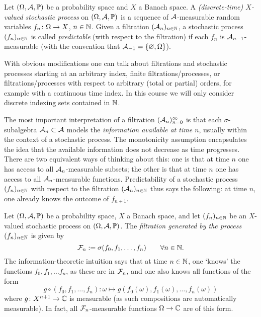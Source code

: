 \begin{defn}
  Let $(\Omega,\mathcal{A},\mathbb{P})$ be a probability space and $X$ a Banach space.
  A \emph{(discrete-time) $X$-valued stochastic process} on $(\Omega,\mathcal{A},\mathbb{P})$ is a sequence of $\mathcal{A}$-measurable random variables $f_n \colon \Omega \rightarrow X$, $n \in \mathbb{N}$.
  Given a filtration $(\mathcal{A}_n)_{n \in \mathbb{N}}$, a stochastic process $(f_n)_{n \in \mathbb{N}}$ is called \emph{predictable} (with respect to the filtration) if each $f_n$ is $\mathcal{A}_{n-1}$-measurable (with the convention that $\mathcal{A}_{-1} = \{\varnothing, \Omega\}$).
\end{defn}

\begin{rmk}
  With obvious modifications one can talk about filtrations and stochastic processes starting at an arbitrary index, finite filtrations/processes, or filtrations/processes with respect to arbitrary (total or partial) orders, for example with a continuous time index.
  In this course we will only consider discrete indexing sets contained in $\mathbb{N}$.
\end{rmk}

The most important interpretation of a filtration $(\mathcal{A}_n)_{n=0}^\infty$ is that each $\sigma$-subalgebra $\mathcal{A}_n \subset \mathcal{A}$ models the \emph{information available at time $n$}, usually within the context of a stochastic process.
The monotonicity assumption encapsulates the idea that the available information does not decrease as time progresses.
There are two equivalent ways of thinking about this: one is that at time $n$ one has access to all $\mathcal{A}_n$-measurable subsets; the other is that at time $n$ one has access to all $\mathcal{A}_n$-measurable functions.
Predictability of a stochastic process $(f_n)_{n \in \mathbb{N}}$ with respect to the filtration $(\mathcal{A}_n)_{n \in \mathbb{N}}$ thus says the following: at time $n$, one already knows the outcome of $f_{n+1}$.

\begin{example}\label{eg:filtration-generated-by-process}
  Let $(\Omega,\mathcal{A},\mathbb{P})$ be a probability space, $X$ a Banach space, and let $(f_n)_{n \in \mathbb{N}}$ be an $X$-valued stochastic process on $(\Omega,\mathcal{A},\mathbb{P})$.
  The \emph{filtration generated by the process $(f_n)_{n \in \mathbb{N}}$} is given by
  \begin{equation*}
    \mathcal{F}_n := \sigma(f_0,f_1,\ldots,f_n) \qquad \forall n \in \mathbb{N}.
  \end{equation*}
  The information-theoretic intuition says that at time $n \in \mathbb{N}$, one `knows' the functions $f_0, f_1, \ldots f_n$, as these are in $\mathcal{F}_n$, and one also knows all functions of the form
  \begin{equation*}
    g \circ (f_0, f_1, \ldots, f_n) \colon \omega \mapsto g(f_0(\omega),f_1(\omega),\ldots,f_n(\omega))
  \end{equation*}
  where $g \colon X^{n+1} \rightarrow \mathbb{C}$ is measurable (as such compositions are automatically measurable).
  In fact, all $\mathcal{F}_n$-measurable functions $\Omega \to \mathbb{C}$ are of this form. %
\end{example}

